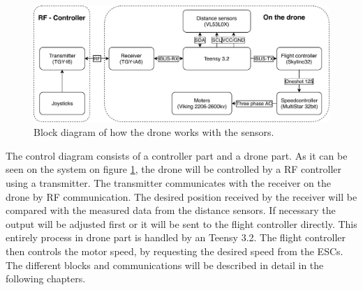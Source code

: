 \begin{figure}[H]
    \centering
    \includegraphics[width=\textwidth]{figures/ch_design/Block-diagram.pdf}
    \caption{Block diagram of how the drone works with the sensors.}
    \label{fig:block_diagram}
\end{figure}

The control diagram consists of a controller part and a drone part. As it can be seen on the system on figure \ref{fig:block_diagram}, the drone will be controlled by a RF controller using a transmitter. The transmitter communicates with the receiver on the drone by RF communication. The desired position received by the receiver will be compared with the measured data from the distance sensors. If necessary the output will be adjusted first or it will be sent to the flight controller directly. This entirely process in drone part is handled by an Teensy 3.2. The flight controller then controls the motor speed, by requesting the desired speed from the ESCs. The different blocks and communications will be described in detail in the following chapters. 
